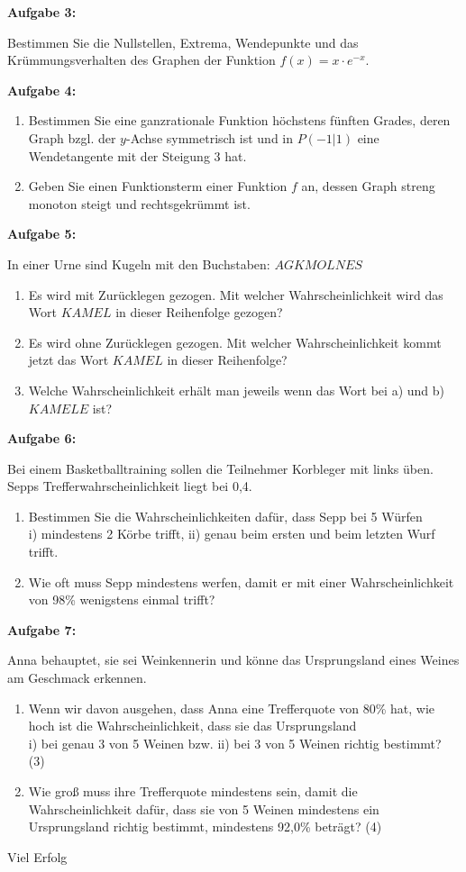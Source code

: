 \documentclass[a4paper,12pt]{article}
\newcommand{\Aufgabe}[1]{
  {
  \vspace*{0.5cm}
  \textsf{\textbf{Aufgabe #1}}
  \vspace*{0.2cm}
  
  }
}
\begin{document}
\Aufgabe{3:} 
Bestimmen Sie die Nullstellen, Extrema, Wendepunkte und das Krümmungsverhalten des Graphen der Funktion ${f(x)=x\cdot e^{-x}}$.

\newpage

\Aufgabe{4:} 
\begin{enumerate}[label={\alph*)}] 
  \item Bestimmen Sie eine ganzrationale Funktion höchstens fünften Grades, deren Graph bzgl. der $y$-Achse symmetrisch ist und in $P (-1|1)$ eine Wendetangente mit der Steigung 3 hat.
  \item Geben Sie einen Funktionsterm einer Funktion $f$ an, dessen Graph streng monoton steigt und rechtsgekrümmt ist.
\end{enumerate}


\Aufgabe{5:} 
In einer Urne sind Kugeln mit den Buchstaben: $AGKMOLNES$
\begin{enumerate}[label={\alph*)}] 
  \item Es wird mit Zurücklegen gezogen. Mit welcher Wahrscheinlichkeit wird das Wort $KAMEL$ in dieser Reihenfolge gezogen?
  \item Es wird ohne Zurücklegen gezogen. Mit welcher Wahrscheinlichkeit kommt jetzt das Wort $KAMEL$ in dieser Reihenfolge?
  \item Welche Wahrscheinlichkeit erhält man jeweils wenn das Wort bei a) und b) $KAMELE$ ist?
\end{enumerate}


\Aufgabe{6:} 
Bei einem Basketballtraining sollen die Teilnehmer Korbleger mit links üben. Sepps Trefferwahrscheinlichkeit liegt bei 0,4.
\begin{enumerate}[label={\alph*)}] 
  \item Bestimmen Sie die Wahrscheinlichkeiten dafür, dass Sepp bei 5 Würfen\\
    i) mindestens 2 Körbe trifft,  ii) genau beim ersten und beim letzten Wurf trifft.
  \item Wie oft muss Sepp mindestens werfen, damit er mit einer Wahrscheinlichkeit von 98\% wenigstens einmal trifft?
\end{enumerate}



\Aufgabe{7:} 
Anna behauptet, sie sei Weinkennerin und könne das Ursprungsland eines Weines am Geschmack erkennen.
\begin{enumerate}[label={\alph*)}] 
  \item Wenn wir davon ausgehen, dass Anna eine Trefferquote von 80\% hat, wie hoch ist die Wahrscheinlichkeit, dass sie das Ursprungsland\\
    i) bei genau 3 von 5 Weinen bzw. 
    ii) bei 3 von 5 Weinen richtig bestimmt? (3)
  \item Wie groß muss ihre Trefferquote mindestens sein, damit die Wahrscheinlichkeit dafür, dass sie von 5 Weinen mindestens ein Ursprungsland richtig bestimmt, mindestens 92,0\% beträgt? (4)
\end{enumerate}


\centerline{Viel Erfolg}
\end{document}
